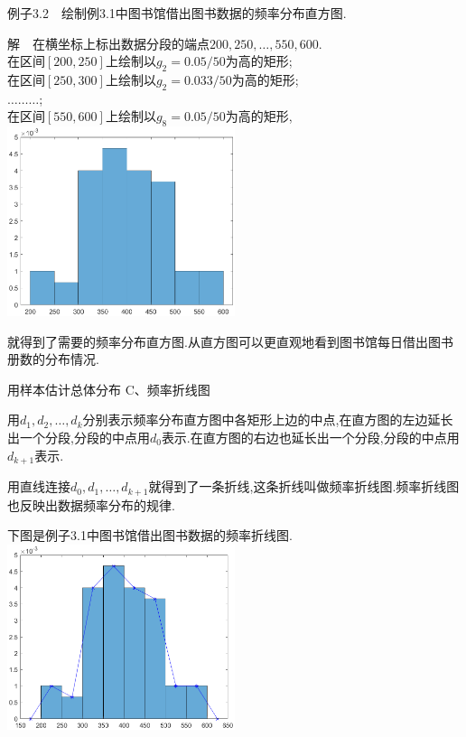 \begin{frame}
例子3.2$\quad$绘制例3.1中图书馆借出图书数据的频率分布直方图.

解$\quad$在横坐标上标出数据分段的端点$200,250,\dots,550,600$.\\
在区间$[200,250]$上绘制以$g_2 = 0.05/50$为高的矩形;\\
在区间$[250,300]$上绘制以$g_2 = 0.033/50$为高的矩形;\\
$\dots \dots \dots$;	\\
在区间$[550,600]$上绘制以$g_8 = 0.05/50$为高的矩形,\\
\centering
\includegraphics[width = 0.5\textwidth]{images/histogram.eps}

就得到了需要的频率分布直方图.从直方图可以更直观地看到图书馆每日借出图书册数的分布情况.
\end{frame}

\begin{frame}{用样本估计总体分布}
\alert{C、频率折线图}

用$d_1,d_2,\dots,d_k$分别表示频率分布直方图中各矩形上边的中点,在直方图的左边延长出一个分段,分段的中点用$d_0$表示.在直方图的右边也延长出一个分段,分段的中点用$d_{k+1}$表示.

用直线连接$d_0,d_1,\dots,d_{k+1}$就得到了一条折线,这条折线叫做频率折线图.频率折线图也反映出数据频率分布的规律.

下图是例子3.1中图书馆借出图书数据的频率折线图.
\centering
\includegraphics[width = 0.5\textwidth]{images/zhexian.eps}
\end{frame}

